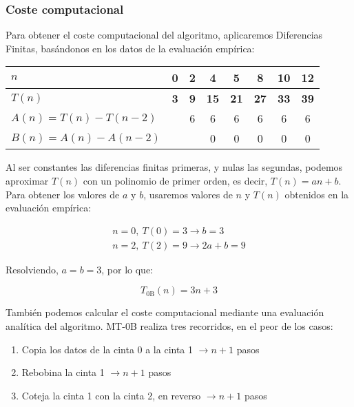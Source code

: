 \subsubsection*{Coste computacional}
Para obtener el coste computacional del algoritmo, aplicaremos Diferencias Finitas, basándonos en los datos de la evaluación empírica:

\begin{table}[H]
    \centering
    \begin{tabular}{|l|c|c|c|c|c|c|c|}
        \hline
        $n$ & \textbf{0} & \textbf{2} & \textbf{4} & \textbf{5} & \textbf{8} & \textbf{10} & \textbf{12} \\ \hline
        $T(n)$ & \textbf{3} & \textbf{9} & \textbf{15} & \textbf{21} & \textbf{27} & \textbf{33} & \textbf{39} \\ \hline
        \hline
        $A(n) = T(n) - T(n-2)$ &    &  6 &  6 &  6 &  6 &  6 &  6 \\ \hline
        $B(n) = A(n) - A(n-2)$ &    &    & 0 &  0 &  0 &  0 &  0 \\ \hline
    \end{tabular}
    \label{tab:0B}
\end{table}

Al ser constantes las diferencias finitas primeras, y nulas las segundas, podemos aproximar $T(n)$ con un polinomio de primer orden, es decir, $T(n) = an + b$.\\

Para obtener los valores de $a$ y $b$, usaremos valores de $n$ y $T(n)$ obtenidos en la evaluación empírica:

\begin{subequations}
    \begin{gather}
        n = 0,\ T(0) = 3 \rightarrow b = 3 \\
        n = 2,\ T(2) = 9 \rightarrow 2a + b = 9
    \end{gather}
\end{subequations}

Resolviendo, $a=b=3$, por lo que:

\begin{equation}
    T_{\mathrm{0B}}(n) = 3n + 3
    \label{eq:Tn0B}
\end{equation}

También podemos calcular el coste computacional mediante una evaluación analítica del algoritmo. MT-0B realiza tres recorridos, en el peor de los casos:
\begin{enumerate}
    \item Copia los datos de la cinta 0 a la cinta 1 $\rightarrow n+1$ pasos
    \item Rebobina la cinta 1 $\rightarrow n+1$ pasos
    \item Coteja la cinta 1 con la cinta 2, en reverso $\rightarrow n+1$ pasos
\end{enumerate}

